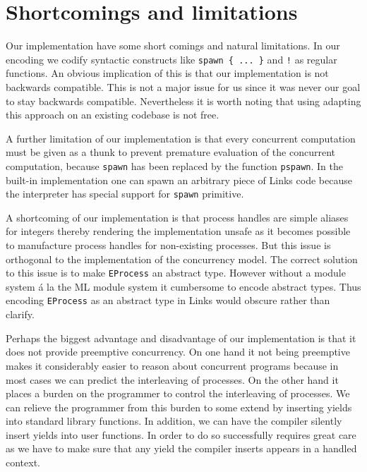 \documentclass[12pt,mscres,cdtppar,twoside,openright,logo,rightchapter,normalheadings]{infthesis}
\theoremstyle{definition}
\begin{document}
\section{Shortcomings and limitations}
\label{sec:limitations}

Our implementation have some short comings and natural limitations. 
%
In our encoding we codify syntactic constructs like
\lstinline$spawn { ... }$ and \lstinline$!$ as regular functions. An
obvious implication of this is that our implementation is not
backwards compatible. This is not a major issue for us since it was
never our goal to stay backwards compatible. Nevertheless it is worth
noting that using adapting this approach on an existing codebase is
not free.

A further limitation of our implementation is that every concurrent
computation must be given as a thunk to prevent premature evaluation
of the concurrent computation, because \lstinline$spawn$ has been
replaced by the function \lstinline$pspawn$. In the built-in
implementation one can spawn an arbitrary piece of Links code because
the interpreter has special support for \lstinline$spawn$ primitive.

A shortcoming of our implementation is that process handles are simple
aliases for integers thereby rendering the implementation unsafe as it
becomes possible to manufacture process handles for non-existing
processes. But this issue is orthogonal to the implementation of the
concurrency model. The correct solution to this issue is to make
\lstinline$EProcess$ an abstract type. However without a module system
á la the ML module system it cumbersome to encode abstract types. Thus
encoding \lstinline$EProcess$ as an abstract type in Links would
obscure rather than clarify.

Perhaps the biggest advantage and disadvantage of our implementation
is that it does not provide preemptive concurrency. On one hand it not
being preemptive makes it considerably easier to reason about
concurrent programs because in most cases we can predict the
interleaving of processes. On the other hand it places a burden on the
programmer to control the interleaving of processes. We can relieve
the programmer from this burden to some extend by inserting yields
into standard library functions. In addition, we can have the
compiler silently insert yields into user functions. In order to do so
successfully requires great care as we have to make sure that any
yield the compiler inserts appears in a handled context.
\end{document}
